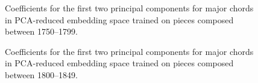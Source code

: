 \begin{figure}
 \centerline{}
 \caption{Coefficients for the first two principal components for major chords in PCA-reduced embedding space trained on pieces composed between 1750--1799.}
 \label{fig:1750_majors}
\end{figure}


\begin{figure}
 \centerline{}
 \caption{Coefficients for the first two principal components for major chords in PCA-reduced embedding space trained on pieces composed between 1800--1849.}
 \label{fig:1800_majors}
\end{figure}


